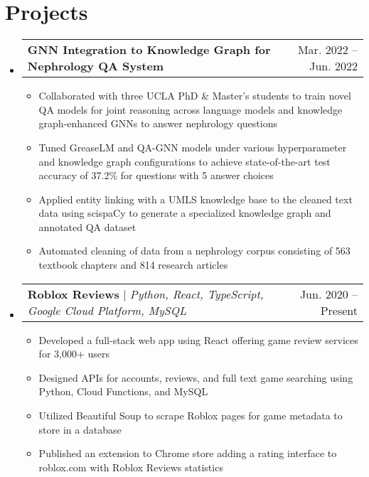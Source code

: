 \documentclass[letterpaper,11pt]{article}
\makeatletter
\newcommand{\resumeItem}[1]{
  \item\small{
    {#1 \vspace{-2pt}}
  }
}
\newcommand{\resumeProjectHeading}[2]{
    \item
    \begin{tabular*}{0.97\textwidth}{l@{\extracolsep{\fill}}r}
      \small#1 & #2 \\
    \end{tabular*}\vspace{-7pt}
}
\newcommand{\resumeSubHeadingListStart}{\begin{itemize}[leftmargin=0.15in, label={}]}
\newcommand{\resumeSubHeadingListEnd}{\end{itemize}}
\newcommand{\resumeItemListStart}{\begin{itemize}}
\newcommand{\resumeItemListEnd}{\end{itemize}\vspace{-5pt}}
\makeatother
\begin{document}
\section{Projects}
    \resumeSubHeadingListStart
      \resumeProjectHeading
        {\textbf{GNN Integration to Knowledge Graph for Nephrology QA System}}{Mar. 2022 -- Jun. 2022}
        \resumeItemListStart
          \resumeItem{Collaborated with three UCLA PhD \& Master's students to train novel QA models for joint reasoning across language models and knowledge graph-enhanced GNNs to answer nephrology questions}
          \resumeItem{Tuned GreaseLM and QA-GNN models under various hyperparameter and knowledge graph configurations to achieve state-of-the-art test accuracy of 37.2\% for questions with 5 answer choices}
          \resumeItem{Applied entity linking with a UMLS knowledge base to the cleaned text data using scispaCy to generate a specialized knowledge graph and annotated QA dataset}
          \resumeItem{Automated cleaning of data from a nephrology corpus consisting of 563 textbook chapters and 814 research articles}
        \resumeItemListEnd

      \resumeProjectHeading
          {\textbf{Roblox Reviews} $|$ \emph{Python, React, TypeScript, Google Cloud Platform, MySQL}}{Jun. 2020 -- Present}
          \resumeItemListStart
            \resumeItem{Developed a full-stack web app using React offering game review services for 3,000+ users}
            \resumeItem{Designed APIs for accounts, reviews, and full text game searching using Python, Cloud Functions, and MySQL}
            \resumeItem{Utilized Beautiful Soup to scrape Roblox pages for game metadata to store in a database}
            \resumeItem{Published an extension to Chrome store adding a rating
            interface to roblox.com with Roblox Reviews statistics}

          \resumeItemListEnd

    \resumeSubHeadingListEnd
\end{document}

